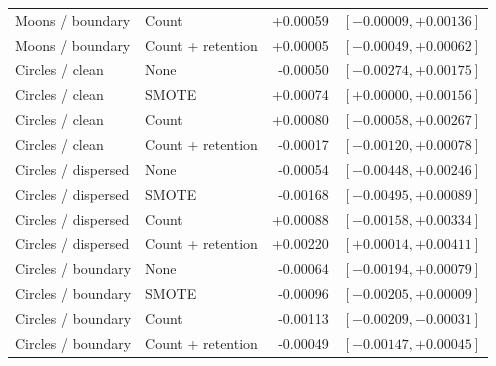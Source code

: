 \begin{table}[htbp]
\begin{tabular}{llrr}
Moons / boundary & Count & +0.00059 & $[-0.00009, +0.00136]$ \\
Moons / boundary & Count + retention & +0.00005 & $[-0.00049, +0.00062]$ \\
Circles / clean & None & -0.00050 & $[-0.00274, +0.00175]$ \\
Circles / clean & SMOTE & +0.00074 & $[+0.00000, +0.00156]$ \\
Circles / clean & Count & +0.00080 & $[-0.00058, +0.00267]$ \\
Circles / clean & Count + retention & -0.00017 & $[-0.00120, +0.00078]$ \\
Circles / dispersed & None & -0.00054 & $[-0.00448, +0.00246]$ \\
Circles / dispersed & SMOTE & -0.00168 & $[-0.00495, +0.00089]$ \\
Circles / dispersed & Count & +0.00088 & $[-0.00158, +0.00334]$ \\
Circles / dispersed & Count + retention & +0.00220 & $[+0.00014, +0.00411]$ \\
Circles / boundary & None & -0.00064 & $[-0.00194, +0.00079]$ \\
Circles / boundary & SMOTE & -0.00096 & $[-0.00205, +0.00009]$ \\
Circles / boundary & Count & -0.00113 & $[-0.00209, -0.00031]$ \\
Circles / boundary & Count + retention & -0.00049 & $[-0.00147, +0.00045]$ \\
\hline
\end{tabular}
\end{table}
\clearpage
